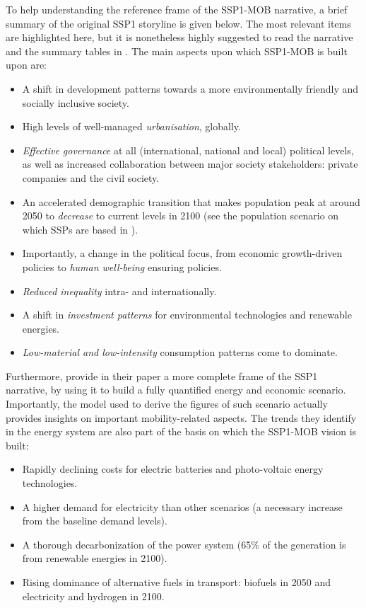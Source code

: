 To help understanding the reference frame of the SSP1-MOB narrative, a brief summary of the original SSP1 storyline is given below. The most relevant items are highlighted here, but it is nonetheless highly suggested to read the narrative and the summary tables in \textcite{oneill2017_roadsaheadNarratives}. The main aspects upon which SSP1-MOB is built upon are:
%
\begin{itemize}
\item A shift in development patterns towards a more environmentally friendly and socially inclusive society.
\item High levels of well-managed \emph{urbanisation}, globally.
\item \emph{Effective governance} at all (international, national and local) political levels, as well as increased collaboration between major society stakeholders: private companies and the civil society.
\item An accelerated demographic transition that makes population peak at around 2050 to \emph{decrease} to current levels in 2100 (see the population scenario on which SSPs are based in \textcite{kc2017_humancoreshared}).
\item Importantly, a change in the political focus, from economic growth-driven policies to \emph{human well-being} ensuring policies.
\item \emph{Reduced inequality} intra- and internationally.
\item A shift in \emph{investment patterns} for environmental technologies and renewable energies.
\item \emph{Low-material and low-intensity} consumption patterns come to dominate.
\end{itemize}

Furthermore, \textcite{vuuren2017_Energylanduse} provide in their paper a more complete frame of the SSP1 narrative, by using it to build a fully quantified energy and economic scenario. Importantly, the model used to derive the figures of such scenario actually provides insights on important mobility-related aspects. The trends they identify in the energy system are also part of the basis on which the SSP1-MOB vision is built:
%
\begin{itemize}
\item Rapidly declining costs for electric batteries and photo-voltaic energy technologies.
\item A higher demand for electricity than other scenarios (a necessary increase from the baseline demand levels).
\item A thorough decarbonization of the power system (65\% of the generation is from renewable energies in 2100).
\item Rising dominance of alternative fuels in transport: biofuels in 2050 and electricity and hydrogen in 2100.
\end{itemize}

